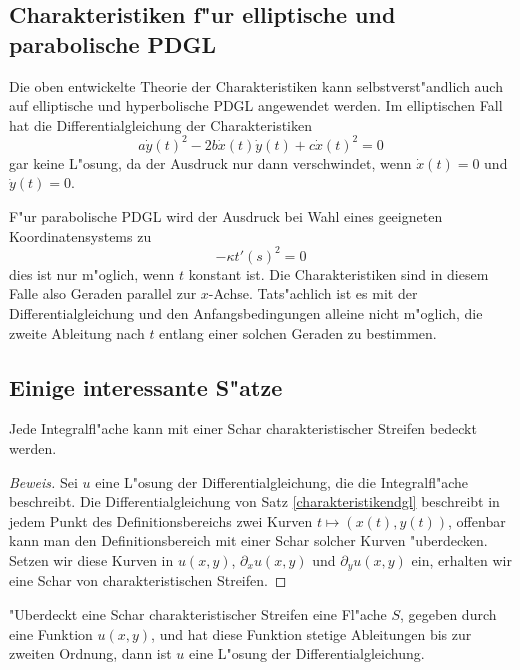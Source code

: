 \subsection{Charakteristiken f"ur elliptische und parabolische PDGL}
Die oben entwickelte Theorie der Charakteristiken kann selbstverst"andlich
auch auf elliptische und hyperbolische PDGL angewendet werden.
Im elliptischen Fall hat die Differentialgleichung der Charakteristiken
\[
a\dot y(t)^2-2b\dot x(t)\dot y(t)+c\dot x(t)^2=0
\]
gar keine L"osung, da der Ausdruck nur dann verschwindet, wenn $\dot x(t)=0$
und $\dot y(t)=0$.

F"ur parabolische PDGL wird der Ausdruck bei Wahl eines geeigneten
Koordinatensystems zu
\[
-\kappa t'(s)^2=0
\]
dies ist nur m"oglich, wenn $t$ konstant ist. Die Charakteristiken
sind in diesem Falle also Geraden parallel zur $x$-Achse.
Tats"achlich ist es mit der Differentialgleichung und
den Anfangsbedingungen alleine nicht
m"oglich, die zweite Ableitung nach $t$ entlang einer solchen Geraden
zu bestimmen.

\subsection{Einige interessante S"atze}

\begin{satz}Jede Integralfl"ache kann mit einer Schar
charakteristischer Streifen bedeckt werden.
\end{satz}

\begin{proof}[Beweis]
Sei $u$ eine L"osung der Differentialgleichung, die die Integralfl"ache beschreibt.
Die Differentialgleichung von Satz \ref{charakteristikendgl}
beschreibt in jedem Punkt des Definitionsbereichs zwei Kurven $t\mapsto(x(t),y(t))$,
offenbar kann man den Definitionsbereich mit einer Schar solcher Kurven
"uberdecken.
Setzen wir diese Kurven in $u(x,y)$, $\partial_xu(x,y)$
und $\partial_yu(x,y)$ ein, erhalten wir eine Schar von charakteristischen
Streifen.
\end{proof}

\begin{satz}"Uberdeckt eine Schar charakteristischer Streifen
eine Fl"ache $S$, gegeben durch eine Funktion $u(x,y)$, und hat
diese Funktion stetige Ableitungen bis zur zweiten Ordnung,
dann ist $u$ eine L"osung der Differentialgleichung.
\end{satz}

